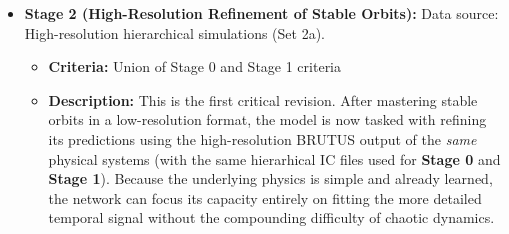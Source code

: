 \documentclass{article}
\begin{document}
\begin{itemize}
\begin{itemize}
        \item \textbf{Stage 1b: Moderately Stable (Angular Momentum Relaxed)}
        \begin{itemize}
            \item \textbf{Criteria:}
            \begin{itemize}
                \item $E < -0.5$
                \item $0.1 \leq \frac{L}{L_{\max}} < 0.5$
                \item $0.7 \leq Q \leq 1.3$
                \item $s_{\min} > 2$
            \end{itemize}
            \item \textbf{Description:} Systems with moderately reduced angular momentum (eccentric orbits) 
            but strong binding energy.
        \end{itemize}
    \end{itemize}
    
    
        
    \item \textbf{Stage 2 (High-Resolution Refinement of Stable Orbits):} 
    Data source: High-resolution hierarchical simulations (Set 2a).
    \begin{itemize}
        \item \textbf{Criteria:} Union of Stage 0 and Stage 1 criteria
        
        \item \textbf{Description:} 
        This is the first critical revision. 
        After mastering stable orbits in a low-resolution format, 
        the model is now tasked with refining its predictions using the high-resolution BRUTUS output of the \emph{same} physical 
        systems (with the same hierarhical IC files used for \textbf{Stage 0} and \textbf{Stage 1}). 
        Because the underlying physics is simple and already learned, 
        the network can focus its capacity entirely on fitting the more detailed temporal signal without the compounding 
        difficulty of chaotic dynamics. 
    \end{itemize}



\end{itemize}
\end{document}
